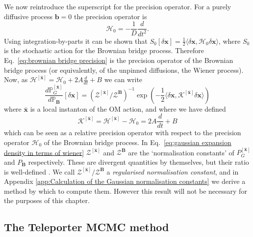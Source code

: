 We now reintroduce the superscript for the precision operator. For a purely diffusive process $\mathbf{b}=0$ the precision operator is
\begin{equation} \label{eq:brownian bridge precision}
	\mathcal{H}_0 = -\frac{1}{D} \frac{d}{d t^2}.
\end{equation}
Using integration-by-parts it can be shown that $S_0[\delta \mathbf{x}] = \frac{1}{2} \langle \delta \mathbf{x}, \mathcal{H}_0 \delta \mathbf{x} \rangle$, where $S_0$ is the stochastic action for the Brownian bridge process. Therefore Eq.~\ref{eq:brownian bridge precision} is the precision operator of the Brownian bridge process (or equivalently, of the unpinned diffusions, the Wiener process). Now, as $\mathcal{H}^{[\bar{\mathbf{x}}]} = \mathcal{H}_0 + 2 A \frac{d}{dt} + B$ we can write
\begin{equation} \label{eq:gaussian expansion density in terms of wiener}
	\frac{d \mathbb{P}_G^{[\bar{\mathbf{x}}]} }{d \mathbb{P}_\mathbf{B}}[ \delta \mathbf{x} ] = (\mathcal{Z}^{[\bar{\mathbf{x}}] } / \mathcal{Z}^\mathbf{B} )^{-1}
	\exp\left( - \frac{1}{2} \langle \delta \mathbf{x}, \mathcal{K}^{[\bar{\mathbf{x}}]} \delta \mathbf{x} \rangle  \right)
\end{equation}
where $\bar{\mathbf{x}}$ is a local instanton of the OM action, and where we have defined
\begin{equation} \label{eq:relative gaussian precision}
	\mathcal{K}^{[\bar{\mathbf{x}}]} = \mathcal{H}^{[\bar{\mathbf{x}}]} - \mathcal{H}_0 = 2A\frac{d}{dt} + B
\end{equation}
which can be seen as a relative precision operator with respect to the precision operator $\mathcal{H}_0$ of the Brownian bridge process. In Eq.~\ref{eq:gaussian expansion density in terms of wiener} $\mathcal{Z}^{[\bar{\mathbf{x}}]}$ and $\mathcal{Z}^\mathbf{B}$ are the `normalisation constants' of $P_G^{[\bar{\mathbf{x}}]}$ and $P_\mathbf{B}$ respectively. These are divergent quantities by themselves, but their ratio is well-defined \citep{gelfandIntegrationFunctionalSpaces1960a}. We call $\mathcal{Z}^{[\bar{\mathbf{x}}] } / \mathcal{Z}^\mathbf{B}$ a \textit{regularised normalisation constant}, and in Appendix \ref{app:Calculation of the Gaussian normalisation constants} we derive a method by which to compute them. However this result will not be necessary for the purposes of this chapter.

\subsection{The Teleporter MCMC method}

